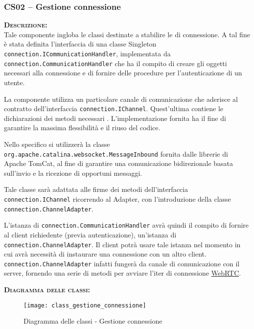 \subsubsection{CS02 -- Gestione connessione}\label{sec:gestioneconnessione}
\begin{description}
	\item{\scshape\bfseries Descrizione:}\\
Tale componente ingloba le classi destinate a stabilire le  di connessione. A tal fine è stata definita l'interfaccia di una classe Singleton \texttt{connection.ICommunicationHandler}, implementata da \texttt{connection.CommunicationHandler} che ha il compito di creare gli oggetti necessari alla connessione e di fornire delle procedure per l'autenticazione di un utente.

La componente utilizza un particolare canale di comunicazione che aderisce al contratto dell'interfaccia \texttt{connection.IChannel}. Quest'ultima contiene le dichiarazioni dei metodi necessari . L'implementazione fornita ha il fine di garantire la massima flessibilità e il riuso del codice.

Nello specifico si utilizzerà la classe \texttt{org.apache.catalina.websocket.MessageInbound} fornita dalle librerie di Apache TomCat, al fine di garantire una comunicazione bidirezionale basata sull'invio e la ricezione di opportuni messaggi.

Tale classe sarà adattata alle firme dei metodi dell'interfaccia \texttt{connection.IChannel} ricorrendo al  Adapter, con l'introduzione della classe \texttt{connection.ChannelAdapter}. 

L'istanza di \texttt{connection.CommunicationHandler} avrà quindi il compito di fornire al client richiedente (previa autenticazione), un'istanza di \texttt{connection.ChannelAdapter}. Il client potrà usare tale istanza nel momento in cui avrà necessità di instaurare una connessione con un altro client. \texttt{connection.ChannelAdapter} infatti fungerà da canale di comunicazione con il server, fornendo una serie di metodi per avviare l'iter di connessione \underline{WebRTC}\@.

	\item{\scshape\bfseries Diagramma delle classi:}
\begin{figure}[H]
  \centering
  \texttt{[image: class\_gestione\_connessione]}
  \caption{Diagramma delle classi - Gestione connessione}\label{fig:gestioneconnessione}
\end{figure}
	

\end{description}
